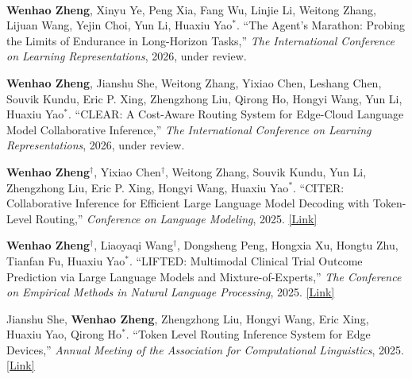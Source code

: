 \vspace{-2mm}

\begin{cventries}

    \cventry
    {} %
    {\ } %
    {\ } %
    {} %
    {
        \vspace{-9mm}
        \begin{cvitemize2}
            \item \textbf{Wenhao Zheng}, Xinyu Ye, Peng Xia, Fang Wu, Linjie Li, Weitong Zhang, Lijuan Wang, Yejin Choi, Yun Li, Huaxiu Yao$^*$. ``The Agent's Marathon: Probing the Limits of Endurance in Long-Horizon Tasks,'' \textit{The International Conference on Learning Representations}, 2026, under review.
            \vspace{1mm}
            \item \textbf{Wenhao Zheng}, Jianshu She, Weitong Zhang, Yixiao Chen, Leshang Chen, Souvik Kundu, Eric P. Xing, Zhengzhong Liu, Qirong Ho, Hongyi Wang, Yun Li, Huaxiu Yao$^*$. ``CLEAR: A Cost-Aware Routing System for Edge-Cloud Language Model Collaborative Inference,'' \textit{The International Conference on Learning Representations}, 2026, under review.
            \vspace{1mm}
            \item \textbf{Wenhao Zheng$^\dagger$}, Yixiao Chen$^\dagger$, Weitong Zhang, Souvik Kundu, Yun Li, Zhengzhong Liu, Eric P. Xing, Hongyi Wang, Huaxiu Yao$^*$. ``CITER: Collaborative Inference for Efficient Large Language Model Decoding with Token-Level Routing,'' \textit{Conference on Language Modeling}, 2025. \href{https://openreview.net/forum?id=nqX9UYW9Af}{\textcolor{link}{[Link]}}
            \vspace{1mm}
            \item \textbf{Wenhao Zheng$^\dagger$}, Liaoyaqi Wang$^\dagger$, Dongsheng Peng, Hongxia Xu, Hongtu Zhu, Tianfan Fu, Huaxiu Yao$^*$. ``LIFTED: Multimodal Clinical Trial Outcome Prediction via Large Language Models and Mixture-of-Experts,'' \textit{The Conference on Empirical Methods in Natural Language Processing}, 2025. \href{https://openreview.net/forum?id=HS4XgL5JyP}{\textcolor{link}{[Link]}}
            \vspace{1mm}
            \item Jianshu She, \textbf{Wenhao Zheng}, Zhengzhong Liu, Hongyi Wang, Eric Xing, Huaxiu Yao, Qirong Ho$^*$. ``Token Level Routing Inference System for Edge Devices,'' \textit{Annual Meeting of the Association for Computational Linguistics}, 2025. \href{https://aclanthology.org/2025.acl-demo.16/}{\textcolor{link}{[Link]}}

\end{cvitemize2}}
\end{cventries}
